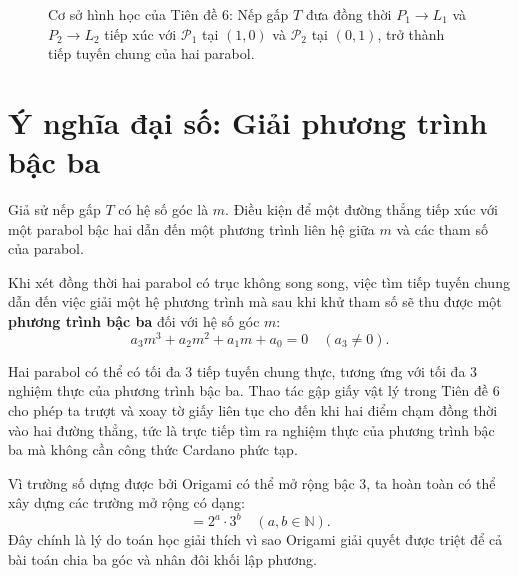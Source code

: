 \begin{figure}[H]
    \caption{Cơ sở hình học của Tiên đề 6: Nếp gấp $T$ đưa đồng thời $P_1 \to L_1$ và $P_2 \to L_2$ tiếp xúc với $\mathcal{P}_1$ tại $(1,0)$ và $\mathcal{P}_2$ tại $(0,1)$, trở thành tiếp tuyến chung của hai parabol.}
    \label{fig:axiom6_tangent_steps}
\end{figure}

\section{Ý nghĩa đại số: Giải phương trình bậc ba}

Giả sử nếp gấp $T$ có hệ số góc là $m$. Điều kiện để một đường thẳng tiếp xúc với một parabol bậc hai dẫn đến một phương trình liên hệ giữa $m$ và các tham số của parabol.

Khi xét đồng thời hai parabol có trục không song song, việc tìm tiếp tuyến chung dẫn đến việc giải một hệ phương trình mà sau khi khử tham số sẽ thu được một \textbf{phương trình bậc ba} đối với hệ số góc $m$:
\begin{equation}
    a_3 m^3 + a_2 m^2 + a_1 m + a_0 = 0 \quad (a_3 \neq 0).
\end{equation}

Hai parabol có thể có tối đa 3 tiếp tuyến chung thực, tương ứng với tối đa 3 nghiệm thực của phương trình bậc ba. Thao tác gập giấy vật lý trong Tiên đề 6 cho phép ta trượt và xoay tờ giấy liên tục cho đến khi hai điểm chạm đồng thời vào hai đường thẳng, tức là trực tiếp tìm ra nghiệm thực của phương trình bậc ba mà không cần công thức Cardano phức tạp.


Vì trường số dựng được bởi Origami có thể mở rộng bậc 3, ta hoàn toàn có thể xây dựng các trường mở rộng có dạng:
\begin{equation}
    [\mathbb{K} : \mathbb{Q}] = 2^a \cdot 3^b \quad (a, b \in \mathbb{N}).
\end{equation}
Đây chính là lý do toán học giải thích vì sao Origami giải quyết được triệt để cả bài toán chia ba góc và nhân đôi khối lập phương.